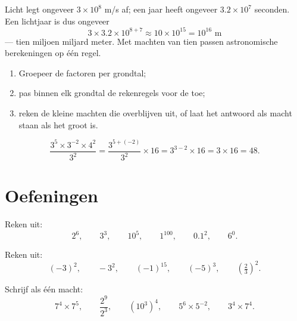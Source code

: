 \begin{example}[Grootteordes]\label{ex:g8:powers:magnitude}
Licht legt ongeveer $3 \times 10^8$ m/s af; een jaar heeft ongeveer
$3.2 \times 10^7$ seconden. Een lichtjaar is dus ongeveer
\[
3 \times 3.2 \times 10^{8+7} \approx 10 \times 10^{15} = 10^{16}
\text{ m}
\]
--- tien miljoen miljard meter. Met machten van tien passen astronomische berekeningen
op één regel.
\end{example}

\begin{method}\label{met:g8:powers:simplify}
\begin{enumerate}
  \item Groepeer de factoren per grondtal;
  \item pas binnen elk grondtal de rekenregels voor de  toe;
  \item reken de kleine machten die overblijven uit, of laat het antwoord als macht
        staan als het groot is.
\end{enumerate}
\end{method}

\begin{example}\label{ex:g8:powers:simplify}
\[
\frac{3^5 \times 3^{-2} \times 4^2}{3^2}
= \frac{3^{5 + (-2)}}{3^2} \times 16
= 3^{3 - 2} \times 16
= 3 \times 16 = 48 .
\]
\end{example}

\section{Oefeningen}

\begin{exercise}[$\star$]\label{exo:g8:powers:1}
Reken uit:
\[
2^6, \qquad 3^3, \qquad 10^5, \qquad 1^{100}, \qquad 0.1^2, \qquad
6^0 .
\]
\end{exercise}

\begin{exercise}[$\star$]\label{exo:g8:powers:2}
Reken uit:
\[
(-3)^2, \qquad -3^2, \qquad (-1)^{15}, \qquad (-5)^3, \qquad
\left(\tfrac{2}{3}\right)^2 .
\]
\end{exercise}

\begin{exercise}[$\star$]\label{exo:g8:powers:3}
Schrijf als één macht:
\[
7^4 \times 7^5, \qquad
\frac{2^9}{2^3}, \qquad
\left(10^3\right)^4, \qquad
5^6 \times 5^{-2}, \qquad
3^4 \times 7^4 .
\]
\end{exercise}

